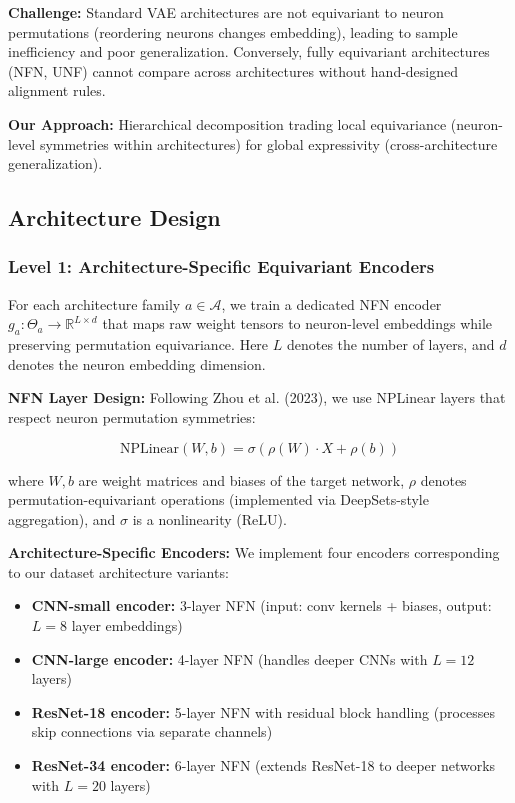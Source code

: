 \textbf{Challenge:} Standard VAE architectures are not equivariant to neuron permutations (reordering neurons changes embedding), leading to sample inefficiency and poor generalization. Conversely, fully equivariant architectures (NFN, UNF) cannot compare across architectures without hand-designed alignment rules.

\textbf{Our Approach:} Hierarchical decomposition trading local equivariance (neuron-level symmetries within architectures) for global expressivity (cross-architecture generalization).

\subsection{Architecture Design}

\subsubsection{Level 1: Architecture-Specific Equivariant Encoders}

For each architecture family $a \in \mathcal{A}$, we train a dedicated NFN encoder $g_a: \Theta_a \rightarrow \mathbb{R}^{L \times d}$ that maps raw weight tensors to neuron-level embeddings while preserving permutation equivariance. Here $L$ denotes the number of layers, and $d$ denotes the neuron embedding dimension.

\textbf{NFN Layer Design:} Following Zhou et al. (2023), we use NPLinear layers that respect neuron permutation symmetries:

\begin{equation}
\text{NPLinear}(W, b) = \sigma\left( \rho(W) \cdot X + \rho(b) \right)
\end{equation}

where $W, b$ are weight matrices and biases of the target network, $\rho$ denotes permutation-equivariant operations (implemented via DeepSets-style aggregation), and $\sigma$ is a nonlinearity (ReLU).

\textbf{Architecture-Specific Encoders:} We implement four encoders corresponding to our dataset architecture variants:

\begin{itemize}
\item \textbf{CNN-small encoder:} 3-layer NFN (input: conv kernels + biases, output: $L=8$ layer embeddings)
\item \textbf{CNN-large encoder:} 4-layer NFN (handles deeper CNNs with $L=12$ layers)
\item \textbf{ResNet-18 encoder:} 5-layer NFN with residual block handling (processes skip connections via separate channels)
\item \textbf{ResNet-34 encoder:} 6-layer NFN (extends ResNet-18 to deeper networks with $L=20$ layers)
\end{itemize}

